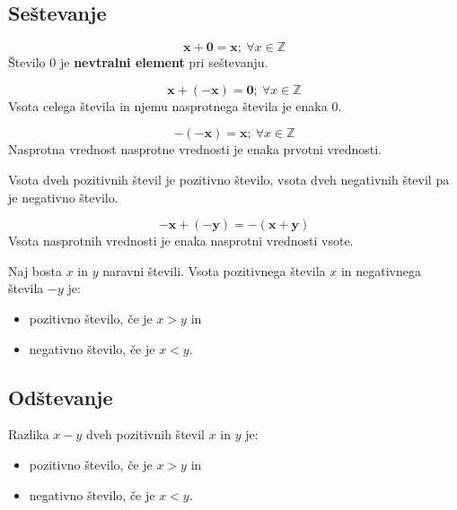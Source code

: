             \subsection{Seštevanje}

             
                $$\mathbf{x+0=x}; ~\forall x\in\mathbb{Z}$$
                Število $0$ je \textbf{nevtralni element} pri seštevanju.
             

             
                $$\mathbf{x+(-x)=0}; ~\forall x\in\mathbb{Z} $$
                Vsota celega števila in njemu nasprotnega števila je enaka $0$.
             

             
                $$\mathbf{-(-x)=x}; ~\forall x\in\mathbb{Z}$$
                Nasprotna vrednost nasprotne vrednosti je enaka prvotni vrednosti.
             \newline
         

             
                Vsota dveh pozitivnih števil je pozitivno število, vsota dveh negativnih števil pa je negativno število.
             

             
                $$\mathbf{-x+(-y)=-(x+y)}$$
                Vsota nasprotnih vrednosti je enaka nasprotni vrednosti vsote.
             \newline

             
                Naj bosta $x$ in $y$ naravni števili. Vsota pozitivnega števila $x$ in negativnega števila $-y$ je:
                \begin{itemize}
                    \item pozitivno število, če je $x>y$ in
                    \item negativno število, če je $x<y$.
                \end{itemize}
             
         


         
            \subsection{Odštevanje}

             
                Razlika $x-y$ dveh pozitivnih števil $x$ in $y$ je:
                \begin{itemize}
                    \item pozitivno število, če je $x>y$ in 
                    \item negativno število, če je $x<y$.
                \end{itemize}
               ~

